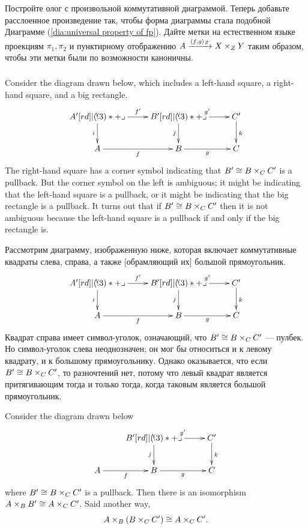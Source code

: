 \begin{exerciseRUS}
Постройте олог с произвольной коммутативной диаграммой. Теперь добавьте расслоенное произведение так, чтобы форма диаграммы стала подобной Диаграмме (\ref{dia:universal property of fp}). Дайте метки на естественном языке проекциям $\pi_1,\pi_2$ и пунктирному отображению $A\xrightarrow{\langle f,g\rangle_{Z}}X\times_ZY$ таким образом, чтобы эти метки были по возможности каноничны.
\end{exerciseRUS}


\subsubsection{}

\begin{blockENG}
Consider the diagram drawn below, which includes a left-hand square, a right-hand square, and a big rectangle.
$$
\xymatrix{
A'\ar[r]^{f'}\ar[d]_i\ullimit&B'\ar[r]^{g'}\ar[d]_j\ullimit&C'\ar[d]^k\\
A\ar[r]_f&B\ar[r]_g&C}
$$
The right-hand square has a corner symbol indicating that $B'\cong B\times_CC'$ is a pullback. But the corner symbol on the left is ambiguous; it might be indicating that the left-hand square is a pullback, or it might be indicating that the big rectangle is a pullback. It turns out that if $B'\cong B\times_CC'$ then it is not ambiguous because the left-hand square is a pullback if and only if the big rectangle is.
\end{blockENG}

\begin{blockRUS}
Рассмотрим диаграмму, изображенную ниже, которая включает коммутативные квадраты слева, справа, а также [обрамляющий их] большой прямоугольник.
$$
\xymatrix{
A'\ar[r]^{f'}\ar[d]_i\ullimit&B'\ar[r]^{g'}\ar[d]_j\ullimit&C'\ar[d]^k\\
A\ar[r]_f&B\ar[r]_g&C}
$$
Квадрат справа имеет символ-уголок, означающий, что $B'\cong B\times_CC'$ — пулбек. Но символ-уголок слева неоднозначен; он мог бы относиться и к левому квадрату, и к большому прямоугольнику. Однако оказывается, что если $B'\cong B\times_CC'$, то разночтений нет, потому что левый квадрат является притягивающим тогда и только тогда, когда таковым является большой прямоугольник.
\end{blockRUS}

\begin{propositionENG}\label{prop:pasting}
Consider the diagram drawn below
$$
\xymatrix{
&B'\ar[r]^{g'}\ar[d]_j\ullimit&C'\ar[d]^k\\
A\ar[r]_f&B\ar[r]_g&C}
$$
where $B'\cong B\times_CC'$ is a pullback. Then there is an isomorphism $A\times_BB'\cong A\times_CC'$. Said another way, $$A\times_B(B\times_CC')\cong A\times_CC'.$$
\end{propositionENG}

